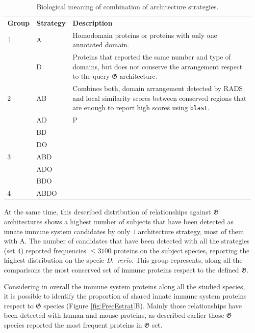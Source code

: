 \documentclass[11pt]{article}
\begin{document}
\begin{table}[ht!]
\centering
\begin{center}
\begin{tabular}{p{2cm}p{2cm}p{5cm}}
\toprule
\textbf{Group} & \textbf{Strategy} & \textbf{Description}\\
1 & A & Homodomain proteins or proteins with only one annotated domain. \\
& D & Proteins that reported the same number and type of domains, but does 
not conserve the arrangement respect to the query $\boldsymbol{\mathfrak{G}}$ architecture. \\
\midrule
2 & AB & Combines both, domain arrangement detected by RADS and local similarity scores 
between conserved regions that are enough to report high scores using \texttt{blast}. \\
& AD & P\\
& BD &\\
& DO &\\
\midrule
3 & ABD &\\
& ADO &\\
& BDO &\\
\midrule
4 & ABDO &\\
\bottomrule
\end{tabular}
\end{center}
\caption{Biological meaning of combination of architecture strategies.}
\label{table:biologicalexplanation}
\end{table}




At the same time, this described distribution of relationships against 
$\boldsymbol{\mathfrak{G}}$ architectures shows a highest number of subjects that 
have been detected as innate immune system candidates by only $1$ architecture 
strategy, most of them with A. The number of candidates that have been detected with 
all the strategies (set $4$) reported frequencies $\leq 3100$ proteins on the 
subject species, reporting the highest distribution on the specie \textit{D.\ 
rerio}. This group represents, along all the comparisons the most conserved 
set of immune proteins respect to the defined $\boldsymbol{\mathfrak{G}}$. 

Considering in overall the immune system proteins along all the studied 
species, it is possible to identify the proportion of shared innate immune 
system proteins respect to $\boldsymbol{\mathfrak{G}}$ species (Figure 
\ref{fig:FrecEstrat}B). Mainly those relationships have been detected with human 
and mouse proteins, as described earlier those $\boldsymbol{\mathfrak{G}}$ 
species reported the most frequent proteins in $\boldsymbol{\mathfrak{G}}$ set. 
\end{document}
